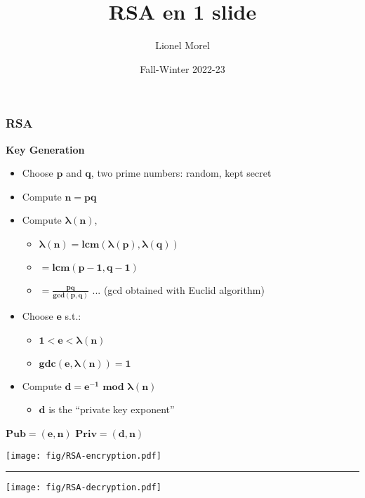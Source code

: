 \documentclass[
hyperref={pdfpagelabels=false}
,xcolor=table
]
{beamer}
\title[Numérique]{RSA en 1 slide}
\author[]{Lionel Morel}
\institute[]{Computer Science and Information Technologies - INSA Lyon}
\date{Fall-Winter 2022-23}
\begin{document}
\begin{frame}
  \frametitle{RSA}

  \begin{minipage}{.48\linewidth}
    \scriptsize
    \textbf{Key Generation}
    
    \begin{itemize}
    \item Choose $\bm{p}$ and $\bm{q}$, two prime numbers: random, kept secret
    \item Compute $\bm{n = pq}$
    \item Compute $\bm{\lambda(n)}$,
      \begin{itemize}    \scriptsize
      \item $\bm{\lambda(n) = lcm(\lambda(p), \lambda(q))}$
      \item $\bm{= lcm(p-1, q-1)}$
      \item $\bm{= \frac{pq}{gcd(p,q)}}$ ... (gcd obtained with Euclid algorithm)
      \end{itemize}
    \item Choose $\bm{e}$ s.t.:
      \begin{itemize}    \scriptsize
      \item $\bm{1 < e < \lambda(n)}$
      \item $\bm{gdc(e,\lambda(n))=1}$
      \end{itemize}
    \item Compute $\bm{d = e^{-1} \mbox{ mod } \lambda(n)}$
      \begin{itemize}    \scriptsize
      \item $\bm{d}$ is the ``private key exponent''
      \end{itemize}
    \end{itemize}

    \begin{tcolorbox}[colframe=Myred]
      \scriptsize
      $\bm{Pub = (e,n)}$ \hfill $\bm{Priv = (d,n)}$
    \end{tcolorbox}
  \end{minipage}
\hfil
  \begin{minipage}{.48\linewidth}
    \texttt{[image: fig/RSA-encryption.pdf]}

\bigskip
    
    \hrule

    \bigskip
    
    \texttt{[image: fig/RSA-decryption.pdf]}
  \end{minipage}
  
\end{frame}
\end{document}
